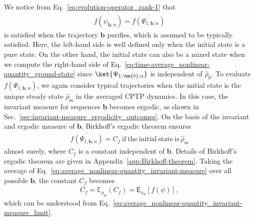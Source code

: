 \documentclass[preprint,pteplogo]{ptephy_v2}%
\numberwithin{equation}{section}
\theoremstyle{definition}
\begin{document}
We notice from Eq.~\eqref{eq:evolution-operator_rank-1} that 
\begin{align}
    \overline{f(\psi_{\bm{b};n})}=\overline{f(\Psi_{1,\bm{b};n})}
    \label{eq:time-average_nonlinear-quantity_ground-state}
\end{align}
is satisfied when the trajectory $\bm{b}$ purifies, which is assumed to be typically satisfied. 
Here, the left-hand side is well defined only when the initial state is a pure state. 
On the other hand, the initial state can also be a mixed state when we compute the right-hand side of Eq.~\eqref{eq:time-average_nonlinear-quantity_ground-state} since $\ket{\Psi_{1,\bm{b};n}}$ is independent of $\hat{\rho}_0$. 
To evaluate $\overline{f(\Psi_{1,\bm{b};n})}$, we again consider typical trajectories when the initial state is the unique steady state $\hat{\rho}_\mathrm{ss}$ in the averaged CPTP dynamics. 
In this case, the invariant measure for sequences $\bm{b}$ becomes ergodic, as shown in Sec.~\ref{sec:invariant-measure_ergodicity_outcomes}. 
On the basis of the invariant and ergodic measure of $\bm{b}$, Birkhoff's ergodic theorem ensures
\begin{align}
    \overline{f(\Psi_{1,\bm{b};n})}=C_f\ \mathrm{if\ the\ initial\ state\ is}\ \hat{\rho}_\mathrm{ss}
    \label{eq:average_nonlinear-quantity_invariant-measure}
\end{align}
almost surely, where $C_f$ is a constant independent of $\bm{b}$. 
Details of Birkhoff's ergodic theorem are given in Appendix~\ref{app:Birkhoff-theorem}. 
Taking the average of Eq.~\eqref{eq:average_nonlinear-quantity_invariant-measure} over all possible $\bm{b}$, the constant $C_f$ becomes
\begin{align}
    C_f=\mathbb{E}_{\rho_\mathrm{ss}}(C_f)
    =\mathsf{E}_{\nu_\mathrm{ss}}[f(\psi)],
    \label{eq:average_nonlinear-function_constant}
\end{align}
which can be understood from Eq.~\eqref{eq:average_nonlinear-quantity_invariant-measure_limit}. 
\end{document}
